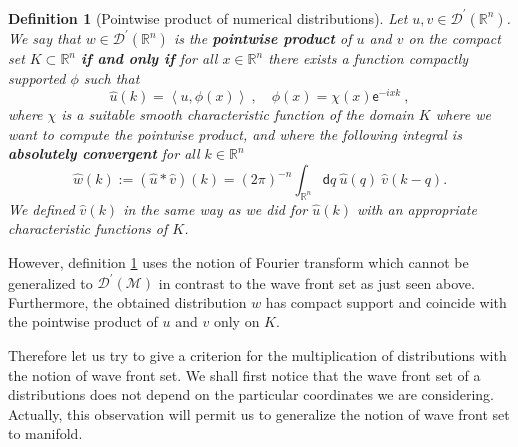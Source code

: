 \documentclass[11pt]{book}
\newcommand{\sm}[1]{\left\langle#1\right\rangle}
\newcommand{\Dcal}{\mathcal{D}}
\newcommand{\Mcal}{\mathcal{M}}
\newcommand{\Rbb}{\mathbb{R}}
\newcommand{\dsf}{\mathsf{d}}
\newcommand{\esf}{\mathsf{e}}
\theoremstyle{break}
\newtheorem{definition}{Definition}[chapter]
\begin{document}
\begin{definition}[Pointwise product of numerical distributions]\label{def:prod_distib_fourier} 
Let $u, v \in \Dcal^\prime(\Rbb^n)$. We say that $w\in\Dcal^\prime(\Rbb^n)$ is the \textbf{pointwise product} of $u$ and $v$ on the compact set $K \subset \Rbb^n$ \textbf{if and only if} for all $x \in \Rbb^n$ there exists a function compactly supported $\phi$ such that
%
\begin{equation*}
\widehat{u}(k) = \sm{u , \phi(x)} \ , \quad \phi(x) = \chi(x) \esf^{-ixk} \ ,
\end{equation*}
%
where $\chi$ is a suitable smooth characteristic function of the domain $K$ where we want to compute the pointwise product, and  where the following integral is \textbf{absolutely convergent} for all $k\in\Rbb^n$
%
\begin{equation*}
\widehat{w}(k) := \left(\widehat{u} \ast \widehat{v}\right)(k) = (2\pi)^{-n} \int_{\Rbb^n} \dsf q \ \widehat{u}(q) \ \widehat{v}(k-q) .
\end{equation*}
%
We defined $\widehat{v}(k)$ in the same way as we did for $\widehat{u}(k)$ with an appropriate characteristic functions of $K$.
\end{definition}


However, definition \ref{def:prod_distib_fourier} uses the notion of Fourier transform which cannot be generalized to $\Dcal^\prime(\Mcal)$ in contrast to the wave front set as just seen above. Furthermore, the obtained distribution $w$ has compact support and coincide with the pointwise product of $u$ and $v$ only on $K$.


\bigskip


Therefore let us try to give a criterion for the multiplication of distributions with the notion of wave front set. We shall first notice that the wave front set of a distributions does not depend on the particular coordinates we are considering. Actually, this observation will permit us to generalize the notion of wave front set to manifold.


\bigskip
\end{document}

